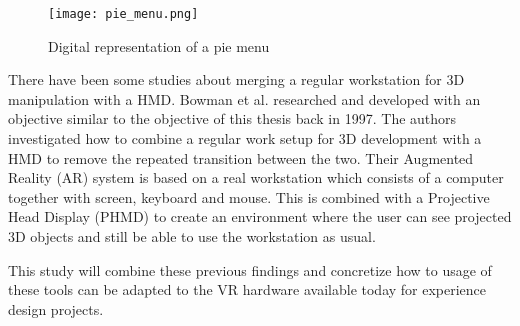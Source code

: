 \begin{figure}
  \centering
  \texttt{[image: pie\_menu.png]}
\caption{Digital representation of a pie menu}
\label{fig:relatedwork:piemenu}
\end{figure}

There have been some studies about merging a regular workstation for 3D manipulation with a HMD\cite{UX:Alger2015}\cite{relatedwork:kijimaand1997transition}. Bowman et al. researched and developed with an objective similar to the objective of this thesis back in 1997\cite{relatedwork:kijimaand1997transition}. The authors investigated how to combine a regular work setup for 3D development with a HMD to remove the repeated transition between the two. Their Augmented Reality (AR) system is based on a real workstation which consists of a computer together with screen, keyboard and mouse. This is combined with a Projective Head Display (PHMD) to create an environment where the user can see projected 3D objects and still be able to use the workstation as usual.

This study will combine these previous findings and concretize how to usage of these tools can be adapted to the VR hardware available today for experience design projects.
